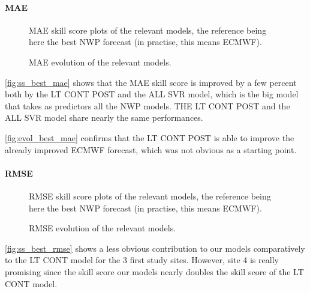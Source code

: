 \paragraph{MAE}
\begin{figure}[htb!]
    \centering
    
\caption{MAE skill score plots of the relevant models, the reference being here the best NWP forecast (in practise, this means ECMWF).}
\label{fig:ss_best_mae}
\end{figure}

\begin{figure}[htb!]
    \centering
    
\caption{MAE evolution of the relevant models.}
\label{fig:evol_best_mae}
\end{figure}
\autoref{fig:ss_best_mae} shows that the MAE skill score is improved by a few percent both by the LT CONT POST and the ALL SVR model, which is the big model that takes as predictors all the NWP models. THE LT CONT POST and the ALL SVR model share nearly the same performances.

\autoref{fig:evol_best_mae} confirms that the LT CONT POST is able to improve the already improved ECMWF forecast, which was not obvious as a starting point.

\paragraph{RMSE}
\begin{figure}[htb!]
    \centering
    
\caption{RMSE skill score plots of the relevant models, the reference being here the best NWP forecast (in practise, this means ECMWF).}
\label{fig:ss_best_rmse}
\end{figure}

\begin{figure}[htb!]
    \centering
    
\caption{RMSE evolution of the relevant models.}
\label{fig:evol_best_rmse}
\end{figure}

\autoref{fig:ss_best_rmse} shows a less obvious contribution to our models comparatively to the LT CONT model for the 3 first study sites.
However, site 4 is really promising since the skill score our models nearly doubles the  skill score of the LT CONT model. \\

